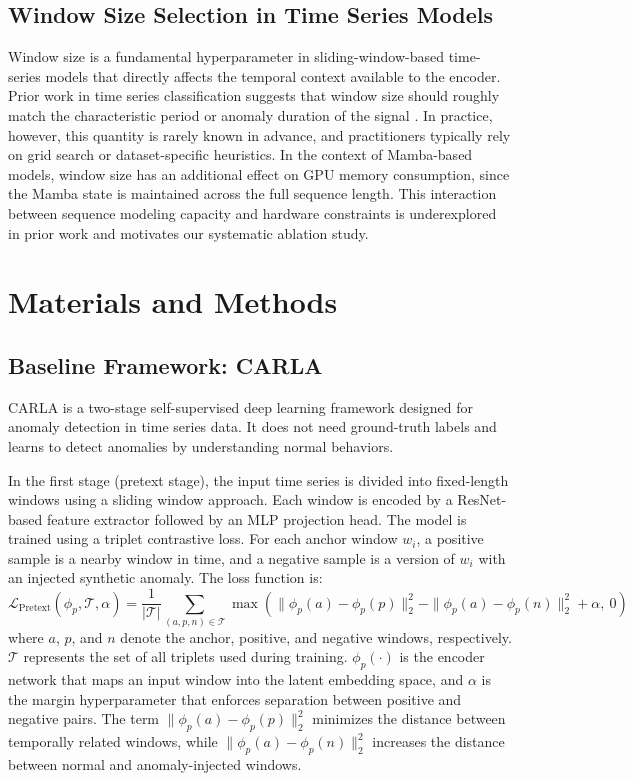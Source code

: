 \documentclass[runningheads]{llncs}
\begin{document}
\subsection{Window Size Selection in Time Series Models}
 
Window size is a fundamental hyperparameter in sliding-window-based time-series models that directly affects the temporal context available to the encoder. Prior work in time series classification suggests that window size should roughly match the characteristic period or anomaly duration of the signal \cite{fawaz2019deep}. In practice, however, this quantity is rarely known in advance, and practitioners typically rely on grid search or dataset-specific heuristics. In the context of Mamba-based models, window size has an additional effect on GPU memory consumption, since the Mamba state is maintained across the full sequence length. This interaction between sequence modeling capacity and hardware constraints is underexplored in prior work and motivates our systematic ablation study.

\section{Materials and Methods}

\subsection{Baseline Framework: CARLA}

CARLA \cite{darban2024carla} is a two-stage self-supervised deep learning framework designed for anomaly detection in time series data. It does not need ground-truth labels and learns to detect anomalies by understanding normal behaviors.

In the first stage (pretext stage), the input time series is divided into fixed-length windows using a sliding window approach. Each window is encoded by a ResNet-based feature extractor followed by an MLP projection head. The model is trained using a triplet contrastive loss. For each anchor window $w_i$, a positive sample is a nearby window in time, and a negative sample is a version of $w_i$ with an injected synthetic anomaly. The loss function is:
\begin{equation}
\mathcal{L}_{\text{Pretext}}(\phi_p, \mathcal{T}, \alpha) = \frac{1}{|\mathcal{T}|} \sum_{(a,p,n) \in \mathcal{T}} \max(\|\phi_p(a) - \phi_p(p)\|_2^2 - \|\phi_p(a) - \phi_p(n)\|_2^2 + \alpha,\ 0)
\end{equation}
where $a$, $p$, and $n$ denote the anchor, positive, and negative windows, respectively. 
$\mathcal{T}$ represents the set of all triplets used during training. 
$\phi_p(\cdot)$ is the encoder network that maps an input window into the latent embedding space, and $\alpha$ is the margin hyperparameter that enforces separation between positive and negative pairs. 
The term $\|\phi_p(a)-\phi_p(p)\|_2^2$ minimizes the distance between temporally related windows, while $\|\phi_p(a)-\phi_p(n)\|_2^2$ increases the distance between normal and anomaly-injected windows.
\end{document}
